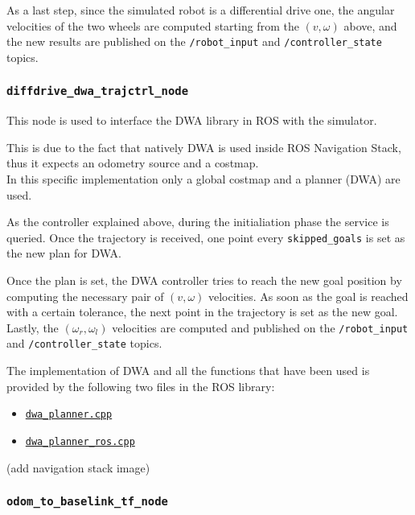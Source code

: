 \documentclass[11pt,a4paper]{article}
\begin{document}
As a last step, since the simulated robot is a differential drive one, the angular velocities of the two wheels are computed starting from the $(v, \omega)$ above, and the new results are published on the \texttt{/robot\_input} and \texttt{/controller\_state} topics.

\subsubsection{\texttt{diffdrive\_dwa\_trajctrl\_node}}

This node is used to interface the DWA library in ROS with the simulator.

This is due to the fact that natively DWA is used inside ROS Navigation Stack, thus it expects an odometry source and a costmap.\\

In this specific implementation only a global costmap and a planner (DWA) are used.

As the controller explained above, during the initialiation phase the service is queried. Once the trajectory is received, one point every \texttt{skipped\_goals} is set as the new plan for DWA.

Once the plan is set, the DWA controller tries to reach the new goal position by computing the necessary pair of $(v, \omega)$ velocities. As soon as the goal is reached with a certain tolerance, the next point in the trajectory is set as the new goal.\\

Lastly, the $(\omega_r,\omega_l)$ velocities are computed and published on the \texttt{/robot\_input} and \texttt{/controller\_state} topics.

The implementation of DWA and all the functions that have been used is provided by the following two files in the ROS library:
\begin{itemize}
 \item \href{https://docs.ros.org/en/melodic/api/dwa\_local\_planner/html/dwa\_\_planner\_8cpp\_source.html}{\texttt{dwa\_planner.cpp}}
 \item \href{https://docs.ros.org/en/melodic/api/dwa\_local\_planner/html/dwa\_\_planner\_\_ros\_8cpp\_source.html}{\texttt{dwa\_planner\_ros.cpp}}
\end{itemize}

(add navigation stack image)

\subsubsection{\texttt{odom\_to\_baselink\_tf\_node}}
\end{document}
